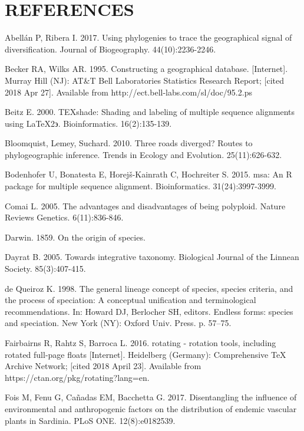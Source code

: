 \chapter*{REFERENCES}
\vspace*{-12pt}

\setlength{\parindent}{-4em}
\setlength{\leftskip}{4em}
\setlength{\parskip}{12pt}
\singlespacing

\hspace*{-4em}

Abellán P, Ribera I. 2017. Using phylogenies to trace the geographical signal of diversification. Journal of Biogeography. 44(10):2236-2246.

Becker RA, Wilks AR. 1995. Constructing a geographical database. [Internet]. Murray Hill (NJ): AT\&T Bell Laboratories Statistics Research Report; [cited 2018 Apr 27]. Available from http://ect.bell-labs.com/sl/doc/95.2.ps

Beitz E. 2000. TEXshade: Shading and labeling of multiple sequence alignments using \LaTeX 2$\backepsilon$. Bioinformatics. 16(2):135-139.

Bloomquist, Lemey, Suchard. 2010. Three roads diverged? Routes to phylogeographic inference. Trends in Ecology and Evolution. 25(11):626-632.

Bodenhofer U, Bonatesta E, Horej\v{s}-Kainrath C, Hochreiter S. 2015. msa: An R package for multiple sequence alignment. Bioinformatics. 31(24):3997-3999.

Comai L. 2005. The advantages and disadvantages of being polyploid. Nature Reviews Genetics. 6(11):836-846.

Darwin. 1859. On the origin of species.

Dayrat B. 2005. Towards integrative taxonomy. Biological Journal of the Linnean Society. 85(3):407-415.

de Queiroz K. 1998. The general lineage concept of species, species criteria, and the process of speciation: A conceptual unification and terminological recommendations. In: Howard DJ, Berlocher SH, editors. Endless forms: species and speciation. New York (NY): Oxford Univ. Press. p. 57–75.


Fairbairns R, Rahtz S, Barroca L. 2016. rotating - rotation tools, including rotated full-page floats [Internet]. Heidelberg (Germany): Comprehensive TeX Archive Network; [cited 2018 April 23]. Available from https://ctan.org/pkg/rotating?lang=en.

Fois M, Fenu G, Cañadas EM, Bacchetta G. 2017. Disentangling the influence of environmental and anthropogenic factors on the distribution of endemic vascular plants in Sardinia. PLoS ONE. 12(8):e0182539.

